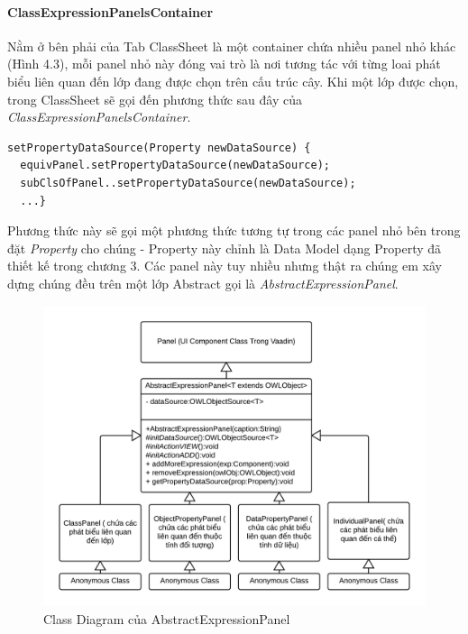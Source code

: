 \paragraph{ClassExpressionPanelsContainer}
Nằm ở bên phải của Tab ClassSheet là một container chứa nhiều panel nhỏ khác (Hình 4.3), mỗi panel nhỏ này đóng vai trò là nơi tương tác với từng loai phát biểu liên quan đến lớp đang được chọn trên cấu trúc cây. Khi một lớp được chọn, trong ClassSheet sẽ gọi đến phương thức sau đây của \textit{ClassExpressionPanelsContainer}.
\begin{verbatim}
setPropertyDataSource(Property newDataSource) {
  equivPanel.setPropertyDataSource(newDataSource);
  subClsOfPanel..setPropertyDataSource(newDataSource);
  ...}
\end{verbatim} 
Phương thức này sẽ gọi một phương thức tương tự trong các panel nhỏ bên trong đặt \textit{Property} cho chúng - Property này chỉnh là Data Model dạng Property đã thiết kế trong chương 3. Các panel này tuy nhiều nhưng thật ra chúng em xây dựng chúng đều trên một lớp Abstract gọi là \textit{AbstractExpressionPanel}.
\begin{figure}[h!]
	\centering
	\includegraphics[width=155mm]{Figures/uml_owleditor_abstractpanel_nobackground.png}
	\caption{Class Diagram của  AbstractExpressionPanel\label{overflow}}
\end{figure}






